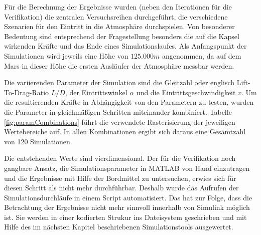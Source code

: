 \label{subsec:reihen}
Für die Berechnung der Ergebnisse wurden (neben den Iterationen für die Verifikation) die zentralen Versuchsreihen durchgeführt, die verschiedene Szenarien für den Eintritt in die Atmosphäre durchspielen. Von besonderer Bedeutung sind entsprechend der Fragestellung besonders die auf die Kapsel wirkenden Kräfte und das Ende eines Simulationslaufes. Als Anfangspunkt der Simulationen wird jeweils eine Höhe von $125.000m$ angenommen, da auf dem Mars in dieser Höhe die ersten Ausläufer der Atmosphäre messbar werden.

Die variierenden Parameter der Simulation sind die Gleitzahl oder englisch Lift-To-Drag-Ratio $L/D$, der Eintrittswinkel $\alpha$ und die Eintrittsgeschwindigkeit $v$. Um die resultierenden Kräfte in Abhängigkeit von den Parametern zu testen, wurden die Parameter in gleichmäßigen Schritten miteinander kombiniert. Tabelle \ref{fig:paramCombinations} führt die verwendete Rasterisierung der jeweiligen Wertebereiche auf. In allen Kombinationen ergibt sich daraus eine Gesamtzahl von 
 120 Simulationen.

Die entstehenden Werte sind vierdimensional. Der für die Verifikation noch gangbare Ansatz, die Simulationsparameter in MATLAB von Hand einzutragen und die Ergebnisse mit Hilfe der Bordmittel zu untersuchen, erwies sich für diesen Schritt als nicht mehr durchführbar. Deshalb wurde das Aufrufen der Simulationsdurchläufe in einem Script automatisiert. Das hat zur Folge, dass die Betrachtung der Ergebnisse nicht mehr sinnvoll innerhalb von Simulink möglich ist. Sie werden in einer kodierten Strukur ins Dateisystem geschrieben und mit Hilfe des im nächsten Kapitel beschriebenen Simulationstools ausgewertet.
